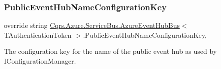 \subsubsection{\texorpdfstring{Public\+Event\+Hub\+Name\+Configuration\+Key}{PublicEventHubNameConfigurationKey}}
{\footnotesize\ttfamily override string \hyperlink{classCqrs_1_1Azure_1_1ServiceBus_1_1AzureEventHubBus}{Cqrs.\+Azure.\+Service\+Bus.\+Azure\+Event\+Hub\+Bus}$<$ T\+Authentication\+Token $>$.Public\+Event\+Hub\+Name\+Configuration\+Key\hspace{0.3cm}{\ttfamily [get]}, {\ttfamily [protected]}}



The configuration key for the name of the public event hub as used by I\+Configuration\+Manager. 

